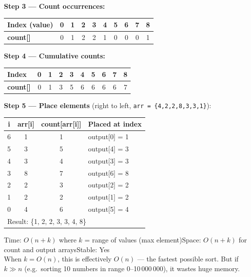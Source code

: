 \documentclass[12pt,a4paper,oneside]{book}
\begin{document}
\begin{dryrun}[Dry Run: arr = \{4, 2, 2, 8, 3, 3, 1\}, max = 8]
\textbf{Step 3 — Count occurrences:}
\begin{center}
\begin{tabular}{!{\color{black!30}\vrule}l!{\color{black!30}\vrule}ccccccccc!{\color{black!30}\vrule}}
\toprule
\textbf{Index (value)} & 0 & 1 & 2 & 3 & 4 & 5 & 6 & 7 & 8\\
\midrule
\textbf{count[]}       & 0 & 1 & 2 & 2 & 1 & 0 & 0 & 0 & 1\\
\bottomrule
\end{tabular}
\end{center}

\textbf{Step 4 — Cumulative counts:}
\begin{center}
\begin{tabular}{!{\color{black!30}\vrule}l!{\color{black!30}\vrule}ccccccccc!{\color{black!30}\vrule}}
\toprule
\textbf{Index} & 0 & 1 & 2 & 3 & 4 & 5 & 6 & 7 & 8\\
\midrule
\textbf{count[]} & 0 & 1 & 3 & 5 & 6 & 6 & 6 & 6 & 7\\
\bottomrule
\end{tabular}
\end{center}

\textbf{Step 5 — Place elements} (right to left, \texttt{arr = \{4,2,2,8,3,3,1\}}):
\begin{center}
\begin{tabular}{cccl}
\toprule
\textbf{i} & \textbf{arr[i]} & \textbf{count[arr[i]]} & \textbf{Placed at index}\\
\midrule
6 & 1 & 1 & output[0] = 1\\
5 & 3 & 5 & output[4] = 3\\
4 & 3 & 4 & output[3] = 3\\
3 & 8 & 7 & output[6] = 8\\
2 & 2 & 3 & output[2] = 2\\
1 & 2 & 2 & output[1] = 2\\
0 & 4 & 6 & output[5] = 4\\
\midrule
\multicolumn{4}{l}{Result: \{1, 2, 2, 3, 3, 4, 8\}}\\
\bottomrule
\end{tabular}
\end{center}
\end{dryrun}

\begin{complexity}
Time: $O(n + k)$ where $k$ = range of values (max element)\quad Space: $O(n + k)$ for count and output arrays\quad Stable: Yes\\[4pt]
When $k = O(n)$, this is effectively $O(n)$ --- the fastest possible sort. But if $k \gg n$ (e.g.\ sorting 10 numbers in range 0--10\,000\,000), it wastes huge memory.
\end{complexity}
\end{document}

